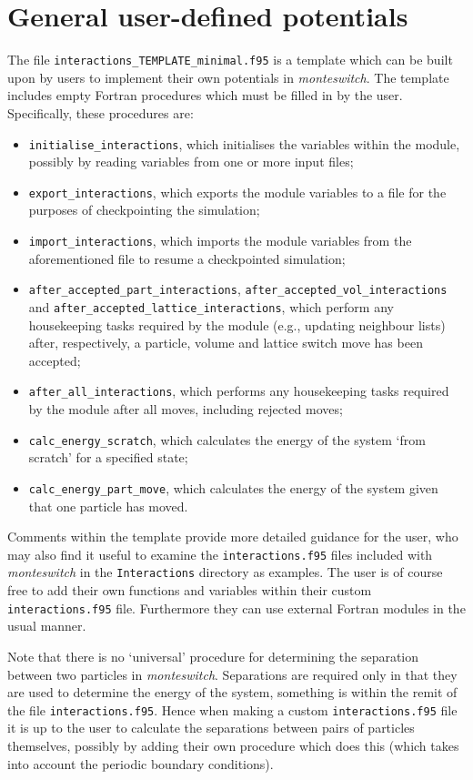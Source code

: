 \documentclass{report}
\begin{document}
\section{General user-defined potentials}
The file \texttt{interactions\_TEMPLATE\_minimal.f95} is a template which can be built upon by users to implement their own potentials
in \emph{monteswitch}. The template includes empty Fortran procedures which must be filled in by the user. Specifically, these
procedures are:
\begin{itemize}
\item
\texttt{initialise\_interactions}, which initialises the variables within the module, possibly 
by reading variables from one or more input files; 
\item
\texttt{export\_interactions}, which exports the module variables to a file for the purposes
of checkpointing the simulation; 
\item
\texttt{import\_interactions}, which imports the module variables from the aforementioned file to resume a checkpointed
simulation; 
\item
\texttt{after\_accepted\_part\_interactions}, \texttt{after\_accepted\_vol\_interactions} and 
\texttt{after\_accepted\_lattice\_interactions}, which perform any housekeeping tasks required by the module (e.g., updating neighbour lists)
after, respectively, a particle, volume and lattice switch move has been accepted; 
\item
\texttt{after\_all\_interactions}, which performs any housekeeping tasks required by the module after all moves, including
rejected moves; 
\item
\texttt{calc\_energy\_scratch}, which calculates the energy of the system `from scratch' for a specified state;
\item
\texttt{calc\_energy\_part\_move}, which calculates the energy of the system given that one particle has moved.
\end{itemize}
%
Comments within the template provide more detailed guidance for the user, who may also find it useful to examine the \texttt{interactions.f95} files 
included with \emph{monteswitch} in the \texttt{Interactions} directory as examples. The user is of course free to add their own 
functions and variables within their custom \texttt{interactions.f95} file. Furthermore they can use external Fortran modules in the usual manner. 

Note that there is no `universal' procedure for determining the separation between two particles in \emph{monteswitch}. Separations are
required only in that they are used to determine the energy of the system, something is within the remit of the file 
\texttt{interactions.f95}. Hence when making a custom \texttt{interactions.f95} file it is up to the user to calculate the separations
between pairs of particles themselves, possibly by adding their own procedure which does this (which takes into account the periodic
boundary conditions). 
\end{document}
